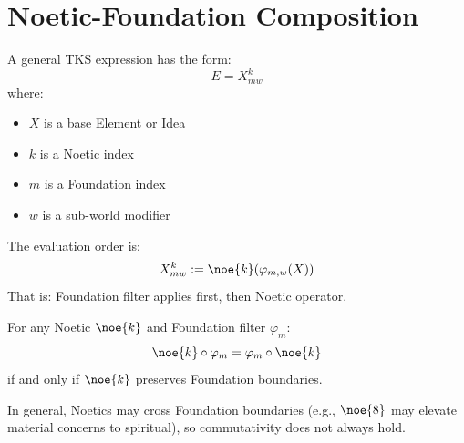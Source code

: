 \section{Noetic-Foundation Composition}

\begin{definition}
\label{def:tks-expr}
A general TKS expression has the form:
\[
E = X^k_{mw}
\]
where:
\begin{itemize}
  \item $X$ is a base Element or Idea
  \item $k$ is a Noetic index
  \item $m$ is a Foundation index
  \item $w$ is a sub-world modifier
\end{itemize}
\end{definition}

\begin{definition}
\label{def:eval-order}
The evaluation order is:
\[
X^k_{mw} := \noe{k}(\varphi_{m,w}(X))
\]
That is: Foundation filter applies first, then Noetic operator.
\end{definition}

\begin{theorem}
\label{thm:noetic-found}
For any Noetic $\noe{k}$ and Foundation filter $\varphi_m$:
\[
\noe{k} \circ \varphi_m = \varphi_m \circ \noe{k}
\]
if and only if $\noe{k}$ preserves Foundation boundaries.
\end{theorem}

\begin{remark}
In general, Noetics may cross Foundation boundaries (e.g., $\noe{8}$ may elevate material concerns to spiritual), so commutativity does not always hold.
\end{remark}



